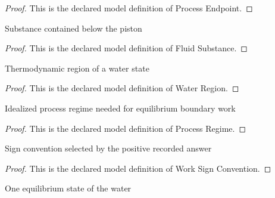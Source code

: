 \begin{proof}
  This is the declared model definition of Process Endpoint.
\end{proof}
\begin{definition}
  \label{def:physics:phyx-mini-0450:phyxminiproblems-problemphyxmini0450-fluidsubstance}
  Substance contained below the piston
\end{definition}
\begin{proof}
  This is the declared model definition of Fluid Substance.
\end{proof}
\begin{definition}
  \label{def:physics:phyx-mini-0450:phyxminiproblems-problemphyxmini0450-waterregion}
  Thermodynamic region of a water state
\end{definition}
\begin{proof}
  This is the declared model definition of Water Region.
\end{proof}
\begin{definition}
  \label{def:physics:phyx-mini-0450:phyxminiproblems-problemphyxmini0450-processregime}
  Idealized process regime needed for equilibrium boundary work
\end{definition}
\begin{proof}
  This is the declared model definition of Process Regime.
\end{proof}
\begin{definition}
  \label{def:physics:phyx-mini-0450:phyxminiproblems-problemphyxmini0450-worksignconvention}
  Sign convention selected by the positive recorded answer
\end{definition}
\begin{proof}
  This is the declared model definition of Work Sign Convention.
\end{proof}
\begin{definition}
  \label{def:physics:phyx-mini-0450:phyxminiproblems-problemphyxmini0450-waterstate}
  One equilibrium state of the water
\end{definition}
